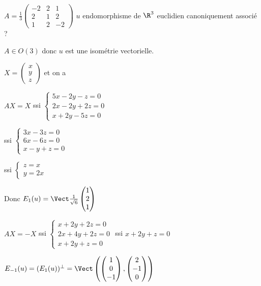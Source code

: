\begin{exemple}
    $A = \frac 1 3 \begin{pmatrix}
        -2 & 2 & 1 \\
        2 & 1 & 2 \\
        1 & 2 & -2
    \end{pmatrix}$ $u$ endomorphisme de $\R^3$ euclidien canoniquement associé ? 

    $A \in O(3)$ donc $u$ est une isométrie vectorielle. 

    $X = \begin{pmatrix}
        x \\ y \\ z 
    \end{pmatrix}$ et on a 

    $AX = X$ ssi $\begin{cases}
        5x - 2y - z = 0 \\
        2x - 2y + 2z = 0 \\
        x + 2y - 5z = 0
    \end{cases}$ 

    ssi $\begin{cases}
        3x - 3z = 0 \\
        6x - 6z = 0 \\
        x - y + z = 0
    \end{cases}$

    ssi $\begin{cases}
        z = x \\
        y = 2x 
    \end{cases}$

    Donc $E_1(u) = \Vect \frac 1 {\sqrt 6} \begin{pmatrix}
        1 \\ 2 \\ 1
    \end{pmatrix}$

    $AX = - X$ ssi $\begin{cases}
        x + 2y + 2z = 0 \\
        2x + 4y + 2z = 0 \\
        x + 2y + z = 0
    \end{cases}$ ssi $x + 2y + z = 0$

    $E_{-1}(u) = (E_1(u))^\perp = \Vect \left( \begin{pmatrix}
        1 \\ 0 \\ - 1
    \end{pmatrix}, \begin{pmatrix}
        2 \\ -1 \\ 0
    \end{pmatrix} \right)$


\end{exemple}
